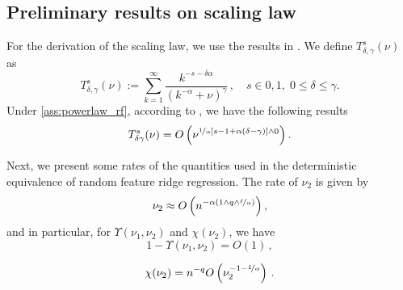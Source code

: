 \subsection{Preliminary results on scaling law}\label{app:pre_scaling_law}

For the derivation of the scaling law, we use the results in \citet[Appendix D]{defilippis2024dimension}. We define $T^s_{\delta,\gamma}(\nu)$ as
\begin{equation*}
    T^s_{\delta,\gamma}(\nu) := \sum_{k = 1}^\infty \frac{k^{-s-\delta\alpha}}{(k^{-\alpha}+\nu)^{\gamma}}\,, \quad s \in {0,1},\;0\leq\delta\leq\gamma.
\end{equation*}
Under \cref{ass:powerlaw_rf}, according to \citet[Appendix D]{defilippis2024dimension}, we have the following results
\begin{equation}\label{eq:rate_T}
T_{\delta\gamma}^{s}(\nu) = O\left(\nu^{\nicefrac{1}{\alpha}\left[s-1 + \alpha(\delta-\gamma)\right]\wedge0}\right).
\end{equation}

Next, we present some rates of the quantities used in the deterministic equivalence of random feature ridge regression. The rate of $\nu_2$ is given by
\begin{equation}\label{eq:rate_nu2}
    \nu_2 \approx O\left(n^{-\alpha\left(1 \wedge q \wedge \nicefrac{\ell}{\alpha}\right)}\right),
\end{equation}
and in particular, for \(\Upsilon(\nu_1, \nu_2)\) and \(\chi (\nu_2)\), we have
\begin{equation}\label{eq:rates:Upsilon2}
    1 - \Upsilon(\nu_1, \nu_2) = O(1)\,,
\end{equation}

\begin{equation}\label{eq:rates:chi}
    \chi (\nu_2) = n^{-q}O\left(\nu_2^{-1-\nicefrac{1}{\alpha}}\right)\,.
\end{equation}